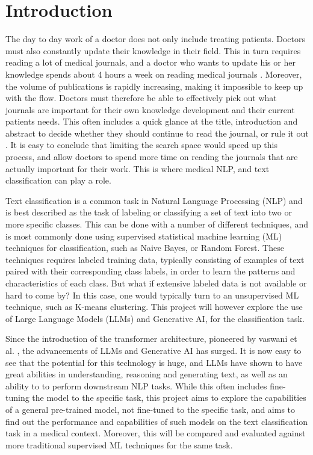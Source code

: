 \section{Introduction}
\label{sec:introduction}


The day to day work of a doctor does not only include treating patients. Doctors must also constantly update their knowledge in their field. This in turn requires reading a lot of medical journals, and a doctor who wants to update his or her knowledge spends about 4 hours a week on reading medical journals \cite{Garba2010ProliferationsBlessing}. Moreover, the volume of publications is rapidly increasing, making it impossible to keep up with the flow. Doctors must therefore be able to effectively pick out what journals are important for their own knowledge development and their current patients needs. This often includes a quick glance at the title, introduction and abstract to decide whether they should continue to read the journal, or rule it out \cite{Garba2010ProliferationsBlessing}. It is easy to conclude that limiting the search space would speed up this process, and allow doctors to spend more time on reading the journals that are actually important for their work. This is where medical NLP, and text classification can play a role.

Text classification is a common task in Natural Language Processing (NLP) and is best described as the task of labeling or classifying a set of text into two or more specific classes. This can be done with a number of different techniques, and is most commonly done using supervised statistical machine learning (ML) techniques for classification, such as Naive Bayes, or Random Forest. These techniques requires labeled training data, typically consisting of examples of text paired with their corresponding class labels, in order to learn the patterns and characteristics of each class. But what if extensive labeled data is not available or hard to come by? In this case, one would typically turn to an unsupervised ML technique, such as K-means clustering. This project will however explore the use of Large Language Models (LLMs) and Generative AI, for the classification task.

Since the introduction of the transformer architecture, pioneered by vaswani et al. \cite{Vaswani2017AttentionNeed}, the advancements of LLMs and Generative AI has surged. It is now easy to see that the potential for this technology is huge, and LLMs have shown to have great abilities in understanding, reasoning and generating text, as well as an ability to to perform downstream NLP tasks. While this often includes fine-tuning the model to the specific task, this project aims to explore the capabilities of a general pre-trained model, not fine-tuned to the specific task, and aims to find out the performance and capabilities of such models on the text classification task in a medical context. Moreover, this will be compared and evaluated against more traditional supervised ML techniques for the same task.